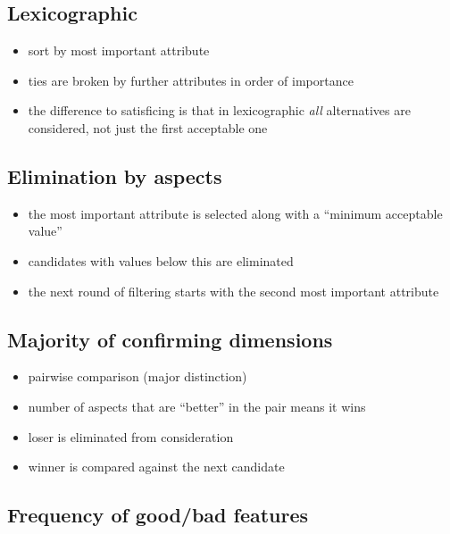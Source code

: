 \subsection{Lexicographic}\label{lexicographic}

\begin{itemize}
\tightlist
\item
  sort by most important attribute
\item
  ties are broken by further attributes in order of importance
\item
  the difference to satisficing is that in lexicographic \emph{all}
  alternatives are considered, not just the first acceptable one
\end{itemize}

\subsection{Elimination by aspects}\label{elimination-by-aspects}

\begin{itemize}
\tightlist
\item
  the most important attribute is selected along with a ``minimum
  acceptable value''
\item
  candidates with values below this are eliminated
\item
  the next round of filtering starts with the second most important
  attribute
\end{itemize}

\subsection{Majority of confirming
dimensions}\label{majority-of-confirming-dimensions}

\begin{itemize}
\tightlist
\item
  pairwise comparison (major distinction)
\item
  number of aspects that are ``better'' in the pair means it wins
\item
  loser is eliminated from consideration
\item
  winner is compared against the next candidate
\end{itemize}

\subsection{Frequency of good/bad
features}\label{frequency-of-goodbad-features}

